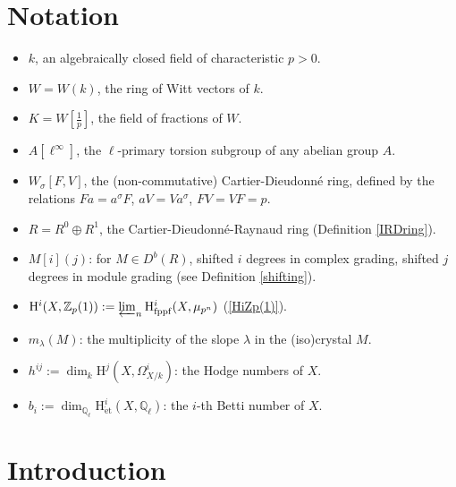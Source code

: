 \documentclass[a4paper,12pt,twoside]{report}
\newcommand{\Q}{\mathbb{Q}}
\newcommand{\Z}{\mathbb{Z}}
\newcommand{\cris}{\mathrm{cris}}
\newcommand{\fppf}{\mathrm{fppf}}
\newcommand{\et}{\mathrm{\acute{e}t}}
\newcommand{\Br}{\mathrm{Br}}
\newcommand{\HH}{\mathrm{H}}
\begin{document}
\chapter*{Notation}
\begin{itemize}
    \item $k$, an algebraically closed field of characteristic $p>0$.
    \item $W=W(k)$, the ring of Witt vectors of $k$.
    \item $K=W[\frac{1}{p}]$, the field of fractions of $W$. 
    \item $A[\ell^\infty]$, the $\ell$-primary torsion subgroup of any abelian group $A$. 
    \item $W_{\sigma}[F,V]$, the (non-commutative) Cartier-Dieudonné ring, defined by the relations $Fa=a^\sigma F$, $aV=Va^\sigma$, $FV=VF=p$. 
    \item $R=R^0\oplus R^1$, the Cartier-Dieudonné-Raynaud ring (Definition \ref{IRDring}). 
    \item $M[i](j)$: for $M\in D^b(R)$, shifted $i$ degrees in complex grading, shifted $j$ degrees in module grading (see Definition \ref{shifting}).
    \item $\HH^i(X,\Z_p(1)):=\varprojlim_{n}\HH^i_{\fppf}(X,\mu_{p^n})$ (\ref{HiZp(1)}). 
    \item $m_{\lambda}(M)$: the multiplicity of the slope $\lambda$ in the (iso)crystal $M$. 
    \item $h^{ij}:=\dim_k \HH^j(X,\Omega^i_{X/k})$: the Hodge numbers of $X$. 
    \item $b_i:=\dim_{\Q_{\ell}}\HH^i_{\et}(X,\Q_{\ell})$: the $i$-th Betti number of $X$. 
\end{itemize}


\chapter*{Introduction}


\end{document}
